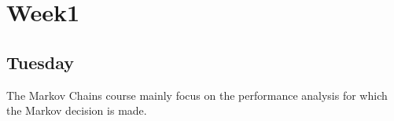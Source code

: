 
\chapter{Week1}

\section{Tuesday}

The Markov Chains course mainly focus on the performance analysis for which the Markov decision is made.

